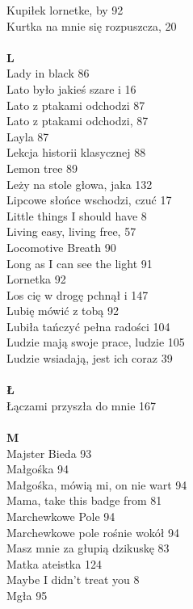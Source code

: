 \documentclass[a5paper, 10pt]{book}
\begin{document}
{\begin{multicols}{3}
    Kupiłek lornetke, by 92\\
    Kurtka na mnie się rozpuszcza, 20\\
    \\
    {\footnotesize \textbf{L\\} }
    Lady in black 86\\
    Lato było jakieś szare i 16\\
    Lato z ptakami odchodzi 87\\
    Lato z ptakami odchodzi, 87\\
    Layla 87\\
    Lekcja historii klasycznej 88\\
    Lemon tree 89\\
    Leży na stole głowa, jaka 132\\
    Lipcowe słońce wschodzi, czuć 17\\
    Little things I should have 8\\
    Living easy, living free, 57\\
    Locomotive Breath 90\\
    Long as I can see the light 91\\
    Lornetka 92\\
    Los cię w drogę pchnął i 147\\
    Lubię mówić z tobą 92\\
    Lubiła tańczyć pełna radości 104\\
    Ludzie mają swoje prace, ludzie 105\\
    Ludzie wsiadają, jest ich coraz 39\\
    \\
    {\footnotesize \textbf{Ł\\} }
    Łączami przyszła do mnie 167\\
    \\
    {\footnotesize \textbf{M\\} }
    Majster Bieda 93\\
    Małgośka 94\\
    Małgośka, mówią mi, on nie wart 94\\
    Mama, take this badge from 81\\
    Marchewkowe Pole 94\\
    Marchewkowe pole rośnie wokół 94\\
    Masz mnie za głupią dzikuskę 83\\
    Matka ateistka 124\\
    Maybe I didn't treat you 8\\
    Mgła 95\\

\end{multicols}}
\end{document}
